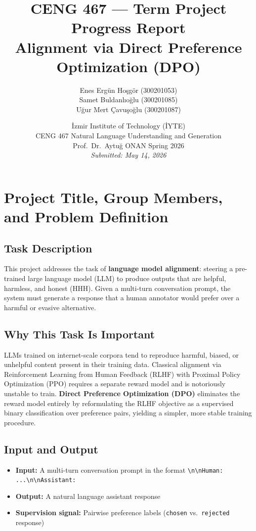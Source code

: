 \documentclass[12pt,a4paper]{article}
\title{
    \textbf{CENG 467 --- Term Project Progress Report} \\[0.5em]
    \Large Alignment via Direct Preference Optimization (DPO)
}
\author{
    Enes Ergün Hoşgör (300201053) \\
    Samet Buldanlıoğlu (300201085) \\
    Uğur Mert Çavuşoğlu (300201087)
}
\date{
    İzmir Institute of Technology (İYTE) \\
    CENG 467 Natural Language Understanding and Generation \\
    Prof.\ Dr.\ Aytuğ ONAN \quad Spring 2026 \\[0.5em]
    \textit{Submitted: May 14, 2026}
}
\begin{document}
\maketitle
\tableofcontents
\newpage

\section{Project Title, Group Members, and Problem Definition}

\subsection*{Task Description}

This project addresses the task of \textbf{language model alignment}: steering a
pre-trained large language model (LLM) to produce outputs that are helpful, harmless,
and honest (HHH). Given a multi-turn conversation prompt, the system must generate a
response that a human annotator would prefer over a harmful or evasive alternative.

\subsection*{Why This Task Is Important}

LLMs trained on internet-scale corpora tend to reproduce harmful, biased, or unhelpful
content present in their training data. Classical alignment via Reinforcement Learning
from Human Feedback (RLHF) with Proximal Policy Optimization (PPO) requires a separate
reward model and is notoriously unstable to train. \textbf{Direct Preference
Optimization (DPO)} \cite{rafailov2023} eliminates the reward model entirely by
reformulating the RLHF objective as a supervised binary classification over
preference pairs, yielding a simpler, more stable training procedure.

\subsection*{Input and Output}

\begin{itemize}[noitemsep]
    \item \textbf{Input:} A multi-turn conversation prompt in the format
          \texttt{\textbackslash n\textbackslash nHuman: ...\textbackslash n\textbackslash nAssistant:}
    \item \textbf{Output:} A natural language assistant response
    \item \textbf{Supervision signal:} Pairwise preference labels
          (\texttt{chosen} vs.\ \texttt{rejected} response)
\end{itemize}
\end{document}
